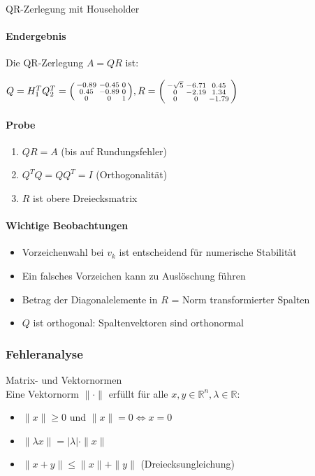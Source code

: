 \begin{example2}[breakable]{QR-Zerlegung mit Householder}
\paragraph{Endergebnis}
Die QR-Zerlegung $A = QR$ ist:

$Q = H_1^TQ_2^T = \begin{psmallmatrix}
-0.89 & -0.45 & 0\\
0.45 & -0.89 & 0\\
0 & 0 & 1
\end{psmallmatrix},
R = \begin{psmallmatrix}
-\sqrt{5} & -6.71 & 0.45\\
0 & -2.19 & 1.34\\
0 & 0 & -1.79
\end{psmallmatrix}$

\paragraph{Probe}
\small
\begin{enumerate}
    \item $QR = A$ (bis auf Rundungsfehler)
    \item $Q^TQ = QQ^T = I$ (Orthogonalität)
    \item $R$ ist obere Dreiecksmatrix
\end{enumerate}

\paragraph{Wichtige Beobachtungen}
\small
\begin{itemize}
    \item Vorzeichenwahl bei $v_k$ ist entscheidend für numerische Stabilität
    \item Ein falsches Vorzeichen kann zu Auslöschung führen
    \item Betrag der Diagonalelemente in $R$ = Norm transformierter Spalten
    \item $Q$ ist orthogonal: Spaltenvektoren sind orthonormal
\end{itemize}
\end{example2}




\subsubsection{Fehleranalyse}

\begin{definition}{Matrix- und Vektornormen}\\
Eine Vektornorm $\|\cdot\|$ erfüllt für alle $x,y \in \mathbb{R}^n, \lambda \in \mathbb{R}$:
\begin{itemize}
    \item $\|x\| \geq 0$ und $\|x\| = 0 \Leftrightarrow x = 0$
    \item $\|\lambda x\| = |\lambda| \cdot \|x\|$
    \item $\|x + y\| \leq \|x\| + \|y\|$ (Dreiecksungleichung)
\end{itemize}
\end{definition}

